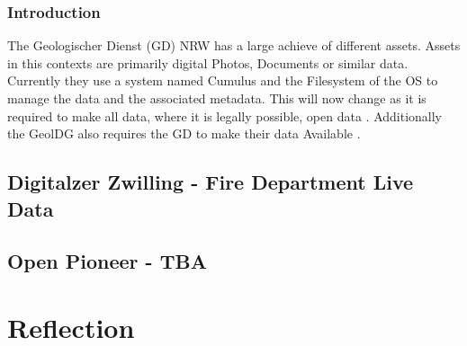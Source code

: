 \documentclass[11pt, titlepage, a4paper]{article}
\begin{document}
\subsubsection{Introduction}
The Geologischer Dienst (GD) NRW has a large achieve of different assets. Assets in this contexts are primarily digital Photos, Documents or similar data. Currently they use a system named Cumulus and the Filesystem of the OS to manage the data and the associated metadata. This will now change as it is required to make all data, where it is legally possible, open data \cite{GesetzZurForderung2017}.
Additionally the GeolDG also requires the GD to make their data Available \cite{GesetzZurStaatlichen2020}.
\subsection{Digitalzer Zwilling - Fire Department Live Data}
\subsection{Open Pioneer - TBA}
\section{Reflection}

\clearpage
\printbibliography
\end{document}
